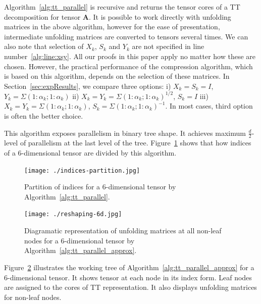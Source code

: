 \documentclass[runningheads]{llncs}
\newcommand{\tensor}[1]{\cal\textbf{#1}\xspace}
\begin{document}
Algorithm~\ref{alg:tt_parallel} is recursive and returns the tensor cores of a TT decomposition for tensor \tensor{A}. It is possible to work directly with unfolding matrices in the above algorithm, however for the ease of presentation, intermediate unfolding matrices are converted to tensors several times. We can also note that selection of $X_k$, $S_k$ and $Y_k$ are not specified in line number~\ref{alg:line:xsy}. All our proofs in this paper apply no matter how these are chosen. However, the practical performance of the compression algorithm, which is based on this algorithm, depends on the selection of these matrices. In Section~\ref{sec:expResults}, we compare three options: i) $X_k=S_k=I$, $Y_k = \Sigma(1:\alpha_k; 1:\alpha_k)$ ii) $X_k = Y_k = \Sigma(1:\alpha_k; 1:\alpha_k)^{1/2}$, $S_k = I$ iii) $X_k = Y_k = \Sigma(1:\alpha_k; 1:\alpha_k)$, $S_k = \Sigma(1:\alpha_k; 1:\alpha_k)^{-1} $. In most cases, third option is often the better choice.

This algorithm exposes parallelism in binary tree shape. It achieves maximum $\frac{d}{2}$-level of parallelism at the last level of the tree.
Figure~\ref{fig:4dindices} shows that how indices of a $6$-dimensional tensor are divided by this algorithm.


\begin{figure}[htb]
	\begin{center}
		\texttt{[image: ./indices-partition.jpg]}
	\end{center}
	\caption{\label{fig:4dindices} Partition of indices for a $6$-dimensional tensor by Algorithm~\ref{alg:tt_parallel}.} 
\end{figure}


\begin{figure}[htb]
	\begin{center}
		\texttt{[image: ./reshaping-6d.jpg]}
	\end{center}
	\caption{Diagramatic representation of unfolding matrices at all non-leaf nodes for a $6$-dimensional tensor by Algorithm~\ref{alg:tt_parallel_approx}.\label{fig:ptt:reshaping}}
\end{figure}

\noindent Figure~\ref{fig:ptt:reshaping} illustrates the working tree of Algorithm~\ref{alg:tt_parallel_approx} for a $6$-dimensional tensor. It shows tensor at each node in its index form. Leaf nodes are assigned to the cores of TT representation. It also displays unfolding matrices for non-leaf nodes.
\end{document}
